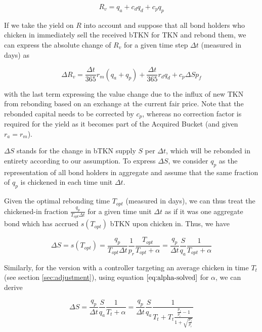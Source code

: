 \documentclass{article}
\begin{document}
\begin{equation}
  \label{eq:correction-factors}
  R_v = q_a + c_d q_d + c_p q_p
\end{equation}

If we take the yield on $R$ into account and suppose that all bond holders who chicken in immediately sell the received bTKN for TKN and rebond them, we can express the absolute change of $R_v$ for a given time step $\Delta t$ (measured in days) as

\begin{equation}
  \label{eq:treasury-growth}
  \Delta R_v = \frac{\Delta t}{365} r_m (q_a + q_p) + \frac{\Delta t}{365} r_d  q_d + c_p \Delta S p_f 
\end{equation}

with the last term expressing the value change due to the influx of new TKN from rebonding based on an exchange at the current fair price. Note that the rebonded capital needs to be corrected by $c_p$, whereas no correction factor is required for the yield as it becomes part of the Acquired Bucket (and given $r_a=r_m$).

$\Delta S$ stands for the change in bTKN supply $S$ per $\Delta t$, which will be rebonded in entirety according to our assumption. To express $\Delta S$, we consider $q_p$ as the representation of all bond holders in aggregate and assume that the same fraction of $q_p$ is chickened in each time unit $\Delta t$. 

Given the optimal rebonding time $T_{opt}$ (measured in days), we can thus treat the chickened-in fraction  $\frac{q_p}{T_{opt} \Delta t}$ for a given time unit $\Delta t$ as if it was one aggregate bond which has accrued $s(T_{opt})$ bTKN upon chicken in. Thus, we have

\begin{equation}
  \label{}
  \Delta S = s(T_{opt}) = \frac{q_p}{T_{opt} \Delta t} \frac{1}{p_r} \frac{T_{opt}}{T_{opt}+\alpha} = \frac{q_p}{\Delta t} \frac{S}{q_a} \frac{1}{T_{opt}+\alpha}
\end{equation}

Similarly, for the version with a controller targeting an average chicken in time $T_t$ (see section \ref{sec:adjustment}), using equation $\ref{eq:alpha-solved}$ for $\alpha$, we can derive

\begin{equation}
  \label{}
  \Delta S = \frac{q_p}{\Delta t} \frac{S}{q_a} \frac{1}{T_t+\alpha}
  = \frac{q_p}{\Delta t} \frac{S}{q_a} \frac{1}{T_t+ T_t\frac{\frac{p_f}{p_r} - 1}{1 + \sqrt{\frac{p_f}{p_r}}}}  
\end{equation}
\end{document}
